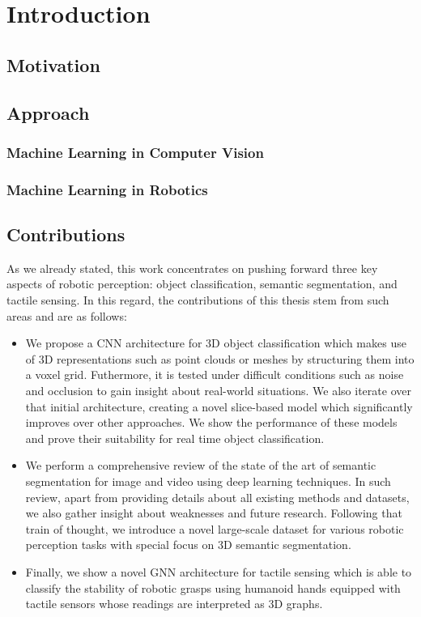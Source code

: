 \chapter{Introduction}
\label{cha:introduction}

\section{Motivation}
\label{cha:introduction:sec:motivation}

\section{Approach}
\label{cha:introduction:sec:approach}

\subsection{Machine Learning in Computer Vision}

\subsection{Machine Learning in Robotics}

\section{Contributions}
\label{cha:introduction:sec:contributions}

As we already stated, this work concentrates on pushing forward three key aspects of robotic perception: object classification, semantic segmentation, and tactile sensing. In this regard, the contributions of this thesis stem from such areas and are as follows:

\begin{itemize}
    \item We propose a \acl{CNN} architecture for \acs{3D} object classification which makes use of \acs{3D} representations such as point clouds or meshes by structuring them into a voxel grid. Futhermore, it is tested under difficult conditions such as noise and occlusion to gain insight about real-world situations. We also iterate over that initial architecture, creating a novel slice-based model which significantly improves over other approaches. We show the performance of these models and prove their suitability for real time object classification.
    \item We perform a comprehensive review of the state of the art of semantic segmentation for image and video using deep learning techniques. In such review, apart from providing details about all existing methods and datasets, we also gather insight about weaknesses and future research. Following that train of thought, we introduce a novel large-scale dataset for various robotic perception tasks with special focus on 3D semantic segmentation.
    \item Finally, we show a novel \acl{GNN} architecture for tactile sensing which is able to classify the stability of robotic grasps using humanoid hands equipped with tactile sensors whose readings are interpreted as \acs{3D} graphs.
\end{itemize}

